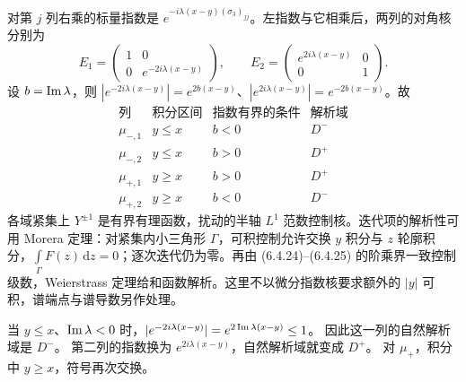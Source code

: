 \documentclass[lang=cn,scheme=chinese,mode=simple,device=normal,color=blue,
math=cm,thmcnt=section,12pt]{elegantbook}
\begin{document}
\begin{callout}
    对第 $j$ 列右乘的标量指数是 $e^{-i\lambda(x-y)(\sigma_3)_{jj}}$。左指数与它相乘后，两列的对角核分别为
    \[
        E_1=\begin{pmatrix}1&0\\0&e^{-2i\lambda(x-y)}\end{pmatrix},\qquad
        E_2=\begin{pmatrix}e^{2i\lambda(x-y)}&0\\0&1\end{pmatrix}.
    \]
    设 $b=\operatorname{Im}\lambda$，则 $|e^{-2i\lambda(x-y)}|=e^{2b(x-y)}$、$|e^{2i\lambda(x-y)}|=e^{-2b(x-y)}$。故
    \[
        \begin{array}{c|c|c|c}
            \text{列}  & \text{积分区间} & \text{指数有界的条件} & \text{解析域} \\\hline
            \mu_{-,1} & y\le x      & b<0            & D^-        \\
            \mu_{-,2} & y\le x      & b>0            & D^+        \\
            \mu_{+,1} & y\ge x      & b>0            & D^+        \\
            \mu_{+,2} & y\ge x      & b<0            & D^-
        \end{array}
    \]
    各域紧集上 $Y^{\pm1}$ 是有界有理函数，扰动的半轴 $L^1$ 范数控制核。迭代项的解析性可用 Morera 定理：对紧集内小三角形 $\Gamma$，可积控制允许交换 $y$ 积分与 $z$ 轮廓积分，$\displaystyle \int\limits_\Gamma F(z)\,\mathrm{d}z=0$；逐次迭代仍为零。再由 (6.4.24)–(6.4.25) 的阶乘界一致控制级数，Weierstrass 定理给和函数解析。这里不以微分指数核要求额外的 $|y|$ 可积，谱端点与谱导数另作处理。
\end{callout}

当 $y\le x$、$\operatorname{Im}\lambda<0$ 时，$|e^{-2i\lambda(x-y)}|=e^{2\operatorname{Im}\lambda(x-y)}\le1$。
因此这一列的自然解析域是 $D^-$。
第二列的指数换为 $e^{2i\lambda(x-y)}$，自然解析域就变成 $D^+$。
对 $\mu_+$，积分中 $y\ge x$，符号再次交换。
\end{document}
